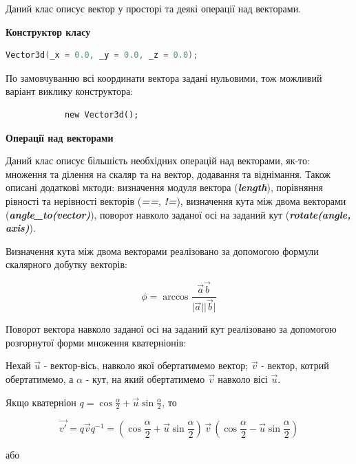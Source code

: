 \documentclass[simple,a4paper,14pt,ukrainian,utf8]{eskdtext}
\newcommand{\abs}[1]{\lvert#1\rvert} %
\begin{document}
            Даний клас описує вектор у просторі та деякі операції над векторами.

            \textbf{Конструктор класу}

            \begin{lstlisting}[language=C++]
            Vector3d(_x = 0.0, _y = 0.0, _z = 0.0);
            \end{lstlisting}

            По замовчуванню всі координати вектора задані нульовими, тож можливий варіант виклику конструктора:

            \begin{lstlisting}
            new Vector3d(); 
            \end{lstlisting}

            \textbf{Операції над векторами}

            Даний клас описує більшість необхідних операцій над векторами, як-то: множення та ділення на скаляр та на вектор, додавання та віднімання. Також описані додаткові мктоди: визначення модуля вектора (\textit{\textbf{length}}), порівняння рівності та нерівності векторів (\textit{\textbf{==}}, \textit{\textbf{!=}}), визначення кута між двома векторами (\textit{\textbf{angle\_to(vector)}}), поворот навколо заданої осі на заданий кут (\textit{\textbf{rotate(angle, axis)}}).

            Визначення кута між двома векторами реалізовано за допомогою формули скалярного добутку векторів:

            $$ \phi = \arccos \frac{\vec{a}\vec{b}}{\abs{\vec{a}}\abs{\vec{b}}} $$

            Поворот вектора навколо заданої осі на заданий кут реалізовано за допомогою розгорнутої форми множення кватерніонів:


            Нехай $\vec{u}$ - вектор-вісь, навколо якої обертатимемо вектор; $\vec{v}$ - вектор, котрий обертатимемо, а $\alpha$ - кут, на який обертатимемо $\vec{v}$ навколо вісі $\vec{u}$.

            Якщо кватерніон $ q = \cos \frac{\alpha}{2} + \vec{u} \sin \frac{\alpha}{2} $, то

            $$ \vec{v'} = q \vec{v} q^{-1} = \left( \cos \frac{\alpha}{2} + \vec{u} \sin \frac{\alpha}{2} \right) \, \vec{v} \, \left( \cos \frac{\alpha}{2} - \vec{u} \sin \frac{\alpha}{2} \right) $$

            або
\end{document}
